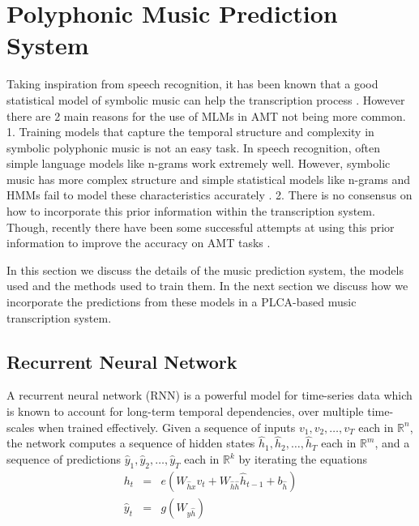 \section{Polyphonic Music Prediction System} 
\label{sec:prediction}
Taking inspiration from speech recognition, it has been known that a good statistical model of symbolic music can help the transcription process \cite{Cemgil2004a}. However there are 2 main reasons for the use of MLMs in AMT not being more common. 1. Training models that capture the temporal structure and complexity in symbolic polyphonic music is not an easy task. In speech recognition, often simple language models like n-grams work extremely well. However, symbolic music has more complex structure and simple statistical models like n-grams and HMMs fail to model these characteristics accurately \cite{Boulanger-Lewandowski2012}. 2. There is no consensus on how to incorporate this prior information within the transcription system. Though, recently there have been some successful attempts at using this prior information to improve the accuracy on AMT tasks \cite{Boulanger-Lewandowski2012,Boulanger-Lewandowski2013}. 


In this section we discuss the details of the music prediction system, the models used and the methods used to train them. In the next section we discuss how we incorporate the predictions from these models in a PLCA-based music transcription system. 


	\subsection{Recurrent Neural Network}
	\label{subsec:rnn}
	A recurrent neural network (RNN) is a powerful model for time-series data which is known to account for long-term temporal dependencies, over multiple time-scales when trained effectively. 
	Given a sequence of inputs $v_1, v_2, \ldots, v_T$ each in $\mathbb{R}^n$, the network computes a sequence of hidden states $\hat{h}_1, \hat{h}_2, \ldots, \hat{h}_T$ each in $\mathbb{R}^m$, and a sequence of predictions $\hat{y}_1, \hat{y}_2, \ldots, \hat{y}_T$ each in $\mathbb{R}^k$ by iterating the equations
	\begin{eqnarray}
		h_t & = & e(W_{\hat{h}x} v_t + W_{\hat{h}\hat{h}} \hat{h}_{t-1} + b_{\hat{h}}) \\
		\hat{y}_t & = & g(W_{y\hat{h}})
	\end{eqnarray}
	
